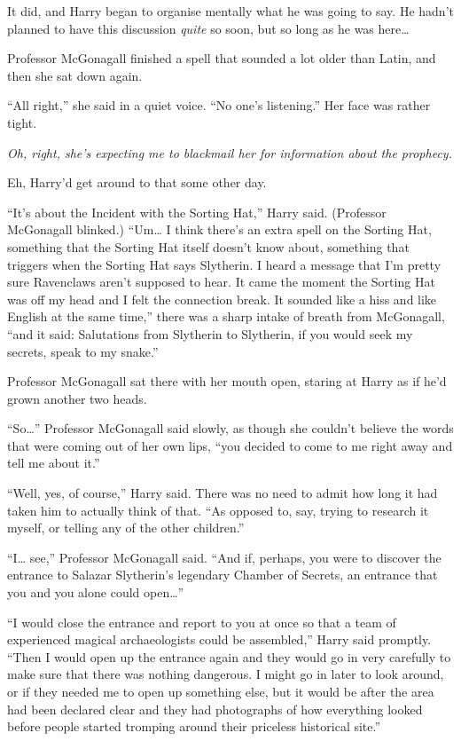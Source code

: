 It did, and Harry began to organise mentally what he was going to say.
He hadn't planned to have this discussion \emph{quite} so soon, but so
long as he was here\ldots{}

Professor McGonagall finished a spell that sounded a lot older than
Latin, and then she sat down again.

``All right,'' she said in a quiet voice. ``No one's listening.'' Her
face was rather tight.

\emph{Oh, right, she's expecting me to blackmail her for information
about the prophecy.}

Eh, Harry'd get around to that some other day.

``It's about the Incident with the Sorting Hat,'' Harry said. (Professor
McGonagall blinked.) ``Um\ldots{} I think there's an extra spell on the
Sorting Hat, something that the Sorting Hat itself doesn't know about,
something that triggers when the Sorting Hat says Slytherin. I heard a
message that I'm pretty sure Ravenclaws aren't supposed to hear. It came
the moment the Sorting Hat was off my head and I felt the connection
break. It sounded like a hiss and like English at the same time,'' there
was a sharp intake of breath from McGonagall, ``and it said: Salutations
from Slytherin to Slytherin, if you would seek my secrets, speak to my
snake.''

Professor McGonagall sat there with her mouth open, staring at Harry as
if he'd grown another two heads.

``So\ldots{}'' Professor McGonagall said slowly, as though she couldn't
believe the words that were coming out of her own lips, ``you decided to
come to me right away and tell me about it.''

``Well, yes, of course,'' Harry said. There was no need to admit how
long it had taken him to actually think of that. ``As opposed to, say,
trying to research it myself, or telling any of the other children.''

``I\ldots{} see,'' Professor McGonagall said. ``And if, perhaps, you
were to discover the entrance to Salazar Slytherin's legendary Chamber
of Secrets, an entrance that you and you alone could open\ldots{}''

``I would close the entrance and report to you at once so that a team of
experienced magical archaeologists could be assembled,'' Harry said
promptly. ``Then I would open up the entrance again and they would go in
very carefully to make sure that there was nothing dangerous. I might go
in later to look around, or if they needed me to open up something else,
but it would be after the area had been declared clear and they had
photographs of how everything looked before people started tromping
around their priceless historical site.''

